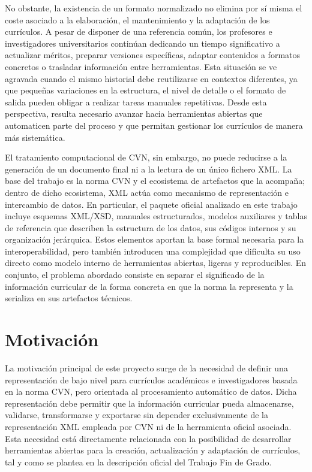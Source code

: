 No obstante, la existencia de un formato normalizado no elimina por sí misma el
coste asociado a la elaboración, el mantenimiento y la adaptación de los
currículos. A pesar de disponer de una referencia común, los profesores e
investigadores universitarios continúan dedicando un tiempo significativo a
actualizar méritos, preparar versiones específicas, adaptar contenidos a formatos
concretos o trasladar información entre herramientas. Esta situación se ve
agravada cuando el mismo historial debe reutilizarse en contextos diferentes, ya
que pequeñas variaciones en la estructura, el nivel de detalle o el formato de
salida pueden obligar a realizar tareas manuales repetitivas. Desde esta
perspectiva, resulta necesario avanzar hacia herramientas abiertas que automaticen
parte del proceso y que permitan gestionar los currículos de manera más
sistemática.

El tratamiento computacional de CVN, sin embargo, no puede reducirse a la
generación de un documento final ni a la lectura de un único fichero XML. La base
del trabajo es la norma CVN y el ecosistema de artefactos que la acompaña; dentro
de dicho ecosistema, XML actúa como mecanismo de representación e intercambio de
datos. En particular, el paquete oficial analizado en este trabajo incluye
esquemas XML/XSD, manuales estructurados, modelos auxiliares y tablas de
referencia que describen la estructura de los datos, sus códigos internos y su
organización jerárquica. Estos elementos aportan la base formal necesaria para la
interoperabilidad, pero también introducen una complejidad que dificulta su uso
directo como modelo interno de herramientas abiertas, ligeras y reproducibles. En
conjunto, el problema abordado consiste en separar el significado de la
información curricular de la forma concreta en que la norma la representa y la
serializa en sus artefactos técnicos.

\section{Motivación}
\label{sec:introduccion_motivacion}

La motivación principal de este proyecto surge de la necesidad de definir una
representación de bajo nivel para currículos académicos e investigadores basada en
la norma CVN, pero orientada al procesamiento automático de datos. Dicha
representación debe permitir que la información curricular pueda almacenarse,
validarse, transformarse y exportarse sin depender exclusivamente de la
representación XML empleada por CVN ni de la herramienta oficial asociada. Esta
necesidad está directamente relacionada con la posibilidad de desarrollar
herramientas abiertas para la creación, actualización y adaptación de currículos,
tal y como se plantea en la descripción oficial del Trabajo Fin de Grado.

